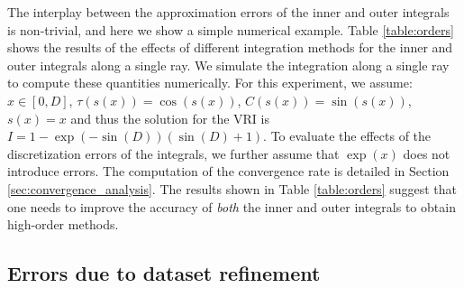 The interplay between the approximation errors of the inner and outer integrals is non-trivial, and
  here we show a simple numerical example.  Table \ref{table:orders} shows the
  results of the effects of different integration methods for the inner and outer integrals along a 
  single ray. We simulate the integration along a single ray to compute these quantities
  numerically. For this experiment, we assume:
  $x \in [0,D]$, $\tau(s(x)) = \cos(s(x))$, $C(s(x)) = \sin(s(x))$, $s(x) = x$ 
  and thus the solution for the VRI is $I = 1-\exp{(-\sin(D))}(\sin(D)+1)$. 
  To evaluate the effects of the discretization errors of the integrals, 
  we further assume that $\exp(x)$ does not introduce errors.  
  The computation of the convergence rate is detailed in Section \ref{sec:convergence_analysis}. The results shown in Table \ref{table:orders} suggest
  that one needs to improve the accuracy of \emph{both} the inner and outer integrals to obtain
  high-order methods.  

\subsection{Errors due to dataset refinement}
\label{sec:VerViaDatasetRefinement}


